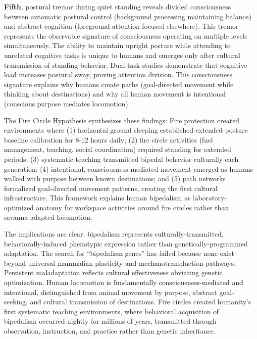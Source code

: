 \documentclass[12pt,a4paper]{article}
\begin{document}
\textbf{Fifth}, postural tremor during quiet standing reveals divided consciousness between automatic postural control (background processing maintaining balance) and abstract cognition (foreground attention focused elsewhere). This tremor represents the observable signature of consciousness operating on multiple levels simultaneously. The ability to maintain upright posture while attending to unrelated cognitive tasks is unique to humans and emerges only after cultural transmission of standing behavior. Dual-task studies demonstrate that cognitive load increases postural sway, proving attention division. This consciousness signature explains why humans create paths (goal-directed movement while thinking about destinations) and why all human movement is intentional (conscious purpose mediates locomotion).

The Fire Circle Hypothesis synthesizes these findings: Fire protection created environments where (1) horizontal ground sleeping established extended-posture baseline calibration for 8-12 hours daily; (2) fire circle activities (fuel management, teaching, social coordination) required standing for extended periods; (3) systematic teaching transmitted bipedal behavior culturally each generation; (4) intentional, consciousness-mediated movement emerged as humans walked with purpose between known destinations; and (5) path networks formalized goal-directed movement patterns, creating the first cultural infrastructure. This framework explains human bipedalism as laboratory-optimized anatomy for workspace activities around fire circles rather than savanna-adapted locomotion.

The implications are clear: bipedalism represents culturally-transmitted, behaviorally-induced phenotypic expression rather than genetically-programmed adaptation. The search for ``bipedalism genes'' has failed because none exist beyond universal mammalian plasticity and mechanotransduction pathways. Persistent maladaptation reflects cultural effectiveness obviating genetic optimization. Human locomotion is fundamentally consciousness-mediated and intentional, distinguished from animal movement by purpose, abstract goal-seeking, and cultural transmission of destinations. Fire circles created humanity's first systematic teaching environments, where behavioral acquisition of bipedalism occurred nightly for millions of years, transmitted through observation, instruction, and practice rather than genetic inheritance.
\end{document}
